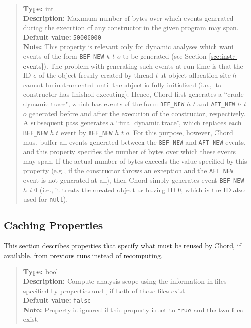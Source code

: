 \begin{quote}
{\bf Type:} int \\
{\bf Description:} Maximum number of bytes over which events generated during the execution of any constructor in the given program may span. \\
{\bf Default value:} {\tt 50000000} \\
{\bf Note:} This property is relevant only for dynamic analyses which want events of the form {\tt BEF\_NEW} $h$ $t$ $o$ to be generated (see Section \ref{sec:instr-events}).  The problem with generating such events at run-time is that the ID $o$ of the object freshly created by thread $t$ at object allocation site $h$ cannot be instrumented until the object is fully initialized (i.e., its constructor has finished executing).  Hence, Chord first generates a ``crude dynamic trace", which has events of the form {\tt BEF\_NEW} $h$ $t$ and {\tt AFT\_NEW} $h$ $t$ $o$ generated before and after the execution of the constructor, respectively.  A subsequent pass generates a ``final dynamic trace", which replaces each {\tt BEF\_NEW} $h$ $t$ event by {\tt BEF\_NEW} $h$ $t$ $o$.  For this purpose, however, Chord must buffer all events generated between the {\tt BEF\_NEW} and {\tt AFT\_NEW} events, and this property specifies the number of bytes over which these events may span.  If the actual number of bytes exceeds the value specified by this property (e.g., if the constructor throws an exception and the {\tt AFT\_NEW} event is not generated at all), then Chord simply generates event {\tt BEF\_NEW} $h$ $i$ $0$ (i.e., it treats the created object as having ID 0, which is the ID also used for {\tt null}). 
\end{quote}

\subsection{Caching Properties}
\label{sec:caching-props}

This section describes properties that specify what must be reused by Chord, if available, from previous runs instead of recomputing.
\\[10pt]

\begin{quote}
{\bf Type:} bool \\
{\bf Description:} Compute analysis scope using the information in files specified by properties  and , if both of those files exist. \\
{\bf Default value:} {\tt false} \\
{\bf Note:} Property  is ignored if this property is set to {\tt true} and the two files exist. 
\end{quote}

